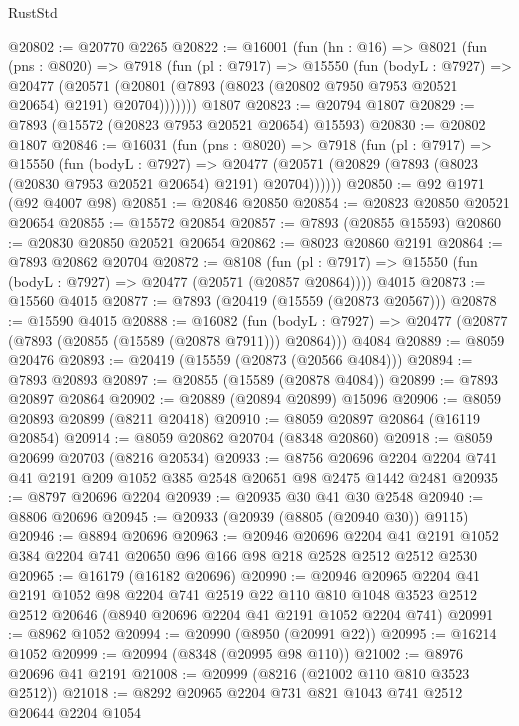 \begin{lexlean}{RustStd}
\begin{coremodule}
@20802 := @20770 @2265
@20822 := @16001
    (fun (hn : @16) =>
    @8021
      (fun (pns : @8020) =>
      @7918
        (fun (pl : @7917) =>
        @15550
          (fun (bodyL : @7927) =>
          @20477
            (@20571 (@20801 (@7893 (@8023 (@20802 @7950 @7953 @20521 @20654) @2191) @20704)))))))
    @1807
@20823 := @20794 @1807
@20829 := @7893 (@15572 (@20823 @7953 @20521 @20654) @15593)
@20830 := @20802 @1807
@20846 := @16031
    (fun (pns : @8020) =>
    @7918
      (fun (pl : @7917) =>
      @15550
        (fun (bodyL : @7927) =>
        @20477 (@20571 (@20829 (@7893 (@8023 (@20830 @7953 @20521 @20654) @2191) @20704))))))
@20850 := @92 @1971 (@92 @4007 @98)
@20851 := @20846 @20850
@20854 := @20823 @20850 @20521 @20654
@20855 := @15572 @20854
@20857 := @7893 (@20855 @15593)
@20860 := @20830 @20850 @20521 @20654
@20862 := @8023 @20860 @2191
@20864 := @7893 @20862 @20704
@20872 := @8108
    (fun (pl : @7917) => @15550 (fun (bodyL : @7927) => @20477 (@20571 (@20857 @20864))))
    @4015
@20873 := @15560 @4015
@20877 := @7893 (@20419 (@15559 (@20873 @20567)))
@20878 := @15590 @4015
@20888 := @16082
    (fun (bodyL : @7927) => @20477 (@20877 (@7893 (@20855 (@15589 (@20878 @7911))) @20864)))
    @4084
@20889 := @8059 @20476
@20893 := @20419 (@15559 (@20873 (@20566 @4084)))
@20894 := @7893 @20893
@20897 := @20855 (@15589 (@20878 @4084))
@20899 := @7893 @20897 @20864
@20902 := @20889 (@20894 @20899) @15096
@20906 := @8059 @20893 @20899 (@8211 @20418)
@20910 := @8059 @20897 @20864 (@16119 @20854)
@20914 := @8059 @20862 @20704 (@8348 @20860)
@20918 := @8059 @20699 @20703 (@8216 @20534)
@20933 := @8756 @20696 @2204 @2204 @741 @41 @2191 @209 @1052 @385 @2548 @20651 @98 @2475 @1442 @2481
@20935 := @8797 @20696 @2204
@20939 := @20935 @30 @41 @30 @2548
@20940 := @8806 @20696
@20945 := @20933 (@20939 (@8805 (@20940 @30)) @9115)
@20946 := @8894 @20696
@20963 := @20946
    @20696
    @2204
    @41
    @2191
    @1052
    @384
    @2204
    @741
    @20650
    @96
    @166
    @98
    @218
    @2528
    @2512
    @2512
    @2530
@20965 := @16179 (@16182 @20696)
@20990 := @20946
    @20965
    @2204
    @41
    @2191
    @1052
    @98
    @2204
    @741
    @2519
    @22
    @110
    @810
    @1048
    @3523
    @2512
    @2512
    @20646
    (@8940 @20696 @2204 @41 @2191 @1052 @2204 @741)
@20991 := @8962 @1052
@20994 := @20990 (@8950 (@20991 @22))
@20995 := @16214 @1052
@20999 := @20994 (@8348 (@20995 @98 @110))
@21002 := @8976 @20696 @41 @2191
@21008 := @20999 (@8216 (@21002 @110 @810 @3523 @2512))
@21018 := @8292 @20965 @2204 @731 @821 @1043 @741 @2512 @20644 @2204 @1054

\end{coremodule}
\end{lexlean}
